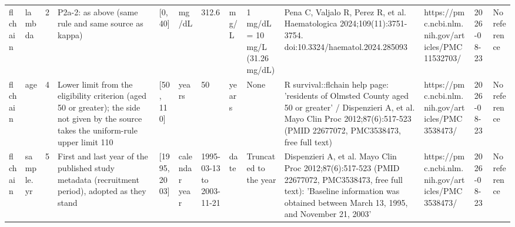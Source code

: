 \begin{tabular}{llrllllllllll}
  flchain & lambda & 2 & P2a-2: as above (same rule and same source as kappa) & [0, 40] & mg/dL & 312.6 & mg/L & 1 mg/dL = 10 mg/L (31.26 mg/dL) & Pena C, Valjalo R, Perez R, et al. Haematologica 2024;109(11):3751-3754. doi:10.3324/haematol.2024.285093 & https://pmc.ncbi.nlm.nih.gov/articles/PMC11532703/ & 2026-08-23 & No reference \\ 
  flchain & age & 4 & Lower limit from the eligibility criterion (aged 50 or greater); the side not given by the source takes the uniform-rule upper limit 110 & [50, 110] & years & 50 & years & None & R survival::flchain help page: 'residents of Olmsted County aged 50 or greater' / Dispenzieri A, et al. Mayo Clin Proc 2012;87(6):517-523 (PMID 22677072, PMC3538473, free full text) & https://pmc.ncbi.nlm.nih.gov/articles/PMC3538473/ & 2026-08-23 & No reference \\ 
  flchain & sample.yr & 5 & First and last year of the published study metadata (recruitment period), adopted as they stand & [1995, 2003] & calendar year & 1995-03-13 to 2003-11-21 & date & Truncated to the year & Dispenzieri A, et al. Mayo Clin Proc 2012;87(6):517-523 (PMID 22677072, PMC3538473, free full text): 'Baseline information was obtained between March 13, 1995, and November 21, 2003' & https://pmc.ncbi.nlm.nih.gov/articles/PMC3538473/ & 2026-08-23 & No reference \\ 
   \bottomrule
\end{tabular}

